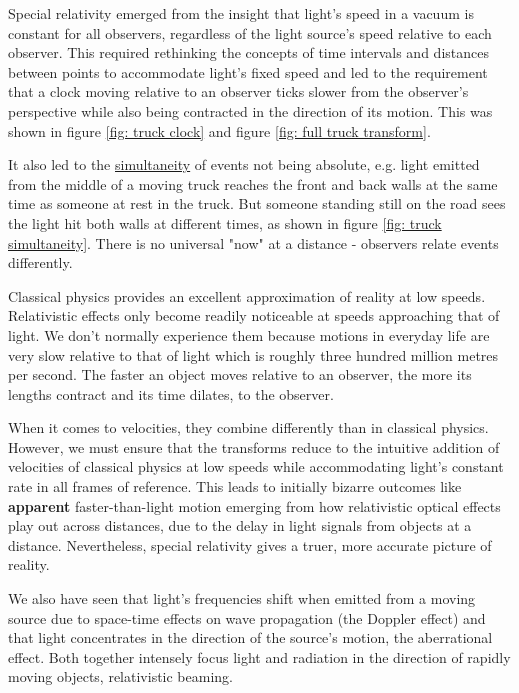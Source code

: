 Special relativity emerged from the insight that light's speed in a vacuum is constant for all observers, regardless of the light source's speed relative to each observer. This required rethinking the concepts of time intervals and distances between points to accommodate light's fixed speed and led to the requirement that a clock moving relative to an observer ticks slower from the observer's perspective while also being contracted in the direction of its motion. This was shown in figure \ref{fig: truck clock} and figure \ref{fig: full truck transform}.

It also led to the \hyperlink{def-simultaneity}{simultaneity} of events not being absolute, e.g. light emitted from the middle of a moving truck reaches the front and back walls at the same time as someone at rest in the truck. But someone standing still on the road sees the light hit both walls at different times, as shown in figure \ref{fig: truck simultaneity}. There is no universal "now" at a distance - observers relate events differently.

Classical physics provides an excellent approximation of reality at low speeds. Relativistic effects only become readily noticeable at speeds approaching that of light. We don't normally experience them because motions in everyday life are very slow relative to that of light which is roughly three hundred million metres per second. The faster an object moves relative to an observer, the more its lengths contract and its time dilates, to the observer.

When it comes to velocities, they combine differently than in classical physics. However, we must ensure that the transforms reduce to the intuitive addition of velocities of classical physics at low speeds while accommodating light's constant rate in all frames of reference. This leads to initially bizarre outcomes like \textbf{apparent} faster-than-light motion emerging from how relativistic optical effects play out across distances, due to the delay in light signals from objects at a distance. Nevertheless, special relativity gives a truer, more accurate picture of reality.

We also have seen that light's frequencies shift when emitted from a moving source due to space-time effects on wave propagation (the Doppler effect) and that light concentrates in the direction of the source's motion, the aberrational effect. Both together intensely focus light and radiation in the direction of rapidly moving objects, relativistic beaming.

